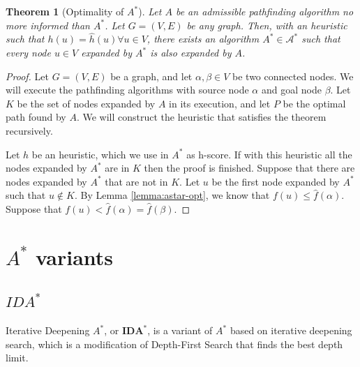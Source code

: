 \documentclass[12pt]{report}
\newtheorem{theorem}{Theorem}[chapter]
\begin{document}
\begin{theorem}[Optimality of $A^*$]
Let $A$ be an admissible pathfinding algorithm no more informed than $A^*$. Let $G=(V,E)$ be any graph. Then, with an heuristic such that $h(u) = \hat{h}(u) \forall u \in V$, there exists an algorithm $A^* \in \mathcal{A^*}$ such that every node $u \in V$ expanded by $A^*$ is also expanded by $A$.
\end{theorem}
\begin{proof}
Let $G = (V, E)$ be a graph, and let $\alpha, \beta \in V$ be two connected nodes. We will execute the pathfinding algorithms with source node $\alpha$ and goal node $\beta$. Let $K$ be the set of nodes expanded by $A$ in its execution, and let $P$ be the optimal path found by $A$. We will construct the heuristic that satisfies the theorem recursively.

Let $h$ be an heuristic, which we use in $A^*$ as h-score. If with this heuristic all the nodes expanded by $A^*$ are in $K$ then the proof is finished. Suppose that there are nodes expanded by $A^*$ that are not in $K$. Let $u$ be the first node expanded by $A^*$ such that $u \not \in K$. By Lemma \ref{lemma:astar-opt}, we know that $f(u) \leq \hat{f}(\alpha)$. Suppose that $f(u) < \hat{f}(\alpha) = \hat{f}(\beta)$.
\end{proof}


\chapter{$A^*$ variants}

\section{$IDA^*$}
Iterative Deepening $A^*$, or $\bm{IDA^*}$, is a variant of $A^*$ based on iterative deepening search, which is a modification of Depth-First Search that finds the best depth limit. %


\end{document}
